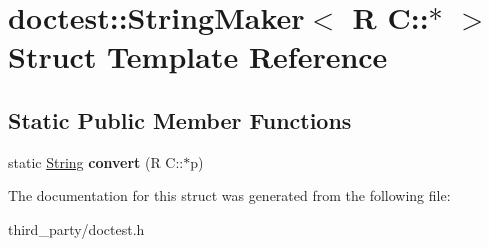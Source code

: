 \hypertarget{structdoctest_1_1_string_maker_3_01_r_01_c_1_1_5_01_4}{}\section{doctest\+::String\+Maker$<$ R C\+::$\ast$ $>$ Struct Template Reference}
\label{structdoctest_1_1_string_maker_3_01_r_01_c_1_1_5_01_4}
\subsection*{Static Public Member Functions}
\begin{DoxyCompactItemize}
\item 
\mbox{\label{structdoctest_1_1_string_maker_3_01_r_01_c_1_1_5_01_4_a06144903aacd73ed31c2fb043be8abb0}} 
static \mbox{\hyperlink{classdoctest_1_1_string}{String}} {\bfseries convert} (R C\+::$\ast$p)
\end{DoxyCompactItemize}


The documentation for this struct was generated from the following file\+:\begin{DoxyCompactItemize}
\item 
third\+\_\+party/doctest.\+h\end{DoxyCompactItemize}

